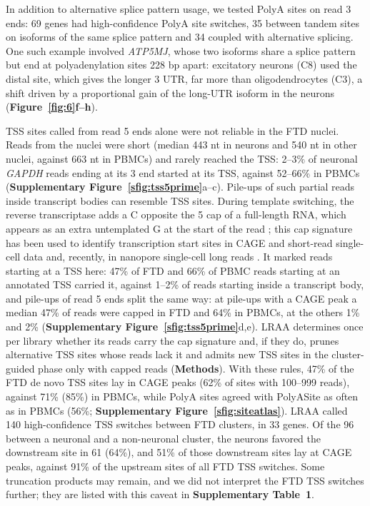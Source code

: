 In addition to alternative splice pattern usage, we tested PolyA sites on read 3\p{} ends: 69 genes had high-confidence PolyA site switches, 35 between tandem sites on isoforms of the same splice pattern and 34 coupled with alternative splicing. One such example involved \emph{ATP5MJ}, whose two isoforms share a splice pattern but end at polyadenylation sites 228 bp apart: excitatory neurons (C8) used the distal site, which gives the longer 3\p{} UTR, far more than oligodendrocytes (C3), a shift driven by a proportional gain of the long-UTR isoform in the neurons (\textbf{Figure~\ref{fig:6}f--h}).

TSS sites called from read 5\p{} ends alone were not reliable in the FTD nuclei. Reads from the nuclei were short (median 443 nt in neurons and 540 nt in other nuclei, against 663 nt in PBMCs) and rarely reached the TSS: 2--3\% of neuronal \emph{GAPDH} reads ending at its 3\p{} end started at its TSS, against 52--66\% in PBMCs (\textbf{Supplementary Figure~\ref{sfig:tss5prime}}a--c). Pile-ups of such partial reads inside transcript bodies can resemble TSS sites. During template switching, the reverse transcriptase adds a C opposite the 5\p{} cap of a full-length RNA, which appears as an extra untemplated G at the start of the read \citep{wulf2019, zajac2013}; this cap signature has been used to identify transcription start sites in CAGE and short-read single-cell data \citep{cumbie2015, moody2022} and, recently, in nanopore single-cell long reads \citep{an2025}. It marked reads starting at a TSS here: 47\% of FTD and 66\% of PBMC reads starting at an annotated TSS carried it, against 1--2\% of reads starting inside a transcript body, and pile-ups of read 5\p{} ends split the same way: at pile-ups with a CAGE peak a median 47\% of reads were capped in FTD and 64\% in PBMCs, at the others 1\% and 2\% (\textbf{Supplementary Figure~\ref{sfig:tss5prime}}d,e). LRAA determines once per library whether its reads carry the cap signature and, if they do, prunes alternative TSS sites whose reads lack it and admits new TSS sites in the cluster-guided phase only with capped reads (\textbf{Methods}). With these rules, 47\% of the FTD de novo TSS sites lay in CAGE peaks (62\% of sites with 100--999 reads), against 71\% (85\%) in PBMCs, while PolyA sites agreed with PolyASite as often as in PBMCs (56\%; \textbf{Supplementary Figure~\ref{sfig:siteatlas}}). LRAA called 140 high-confidence TSS switches between FTD clusters, in 33 genes. Of the 96 between a neuronal and a non-neuronal cluster, the neurons favored the downstream site in 61 (64\%), and 51\% of those downstream sites lay at CAGE peaks, against 91\% of the upstream sites of all FTD TSS switches. Some truncation products may remain, and we did not interpret the FTD TSS switches further; they are listed with this caveat in \textbf{Supplementary Table~1}.

